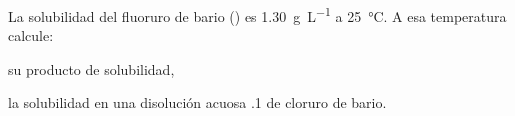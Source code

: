 La solubilidad del fluoruro de bario () es \SI{1,30}{\gram\per\liter} a \SI{25}{\celsius}. A esa temperatura calcule:
\begin{enumerate*}[label={\alph*)},font=\bfseries]
	\item su producto de solubilidad,
	\item la solubilidad en una disolución acuosa \SI{,1}{\Molar} de cloruro de bario.
\end{enumerate*}
